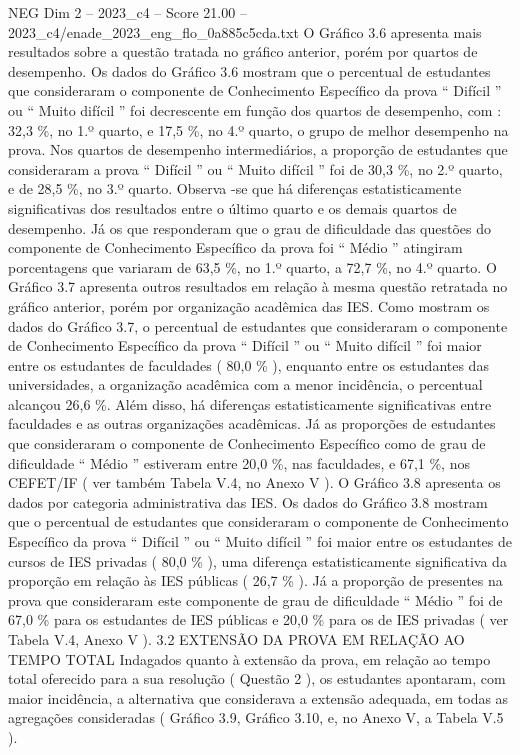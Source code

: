 \begin{textsample}{NEG Dim 2 – 2023\_c4 – Score 21.00 – 2023\_c4/enade\_2023\_eng\_flo\_0a885c5cda.txt}
O Gráfico 3.6 apresenta mais resultados sobre a questão tratada no gráfico anterior, porém por quartos de desempenho.
Os dados do Gráfico 3.6 mostram que o percentual de estudantes que consideraram o componente de Conhecimento Específico da prova “ Difícil ” ou “ Muito difícil ” foi decrescente em função dos quartos de desempenho, com : 32,3 \%, no 1.º quarto, e 17,5 \%, no 4.º quarto, o grupo de melhor desempenho na prova.
Nos quartos de desempenho intermediários, a proporção de estudantes que consideraram a prova “ Difícil ” ou “ Muito difícil ” foi de 30,3 \%, no 2.º quarto, e de 28,5 \%, no 3.º quarto.
Observa -se que há diferenças estatisticamente significativas dos resultados entre o último quarto e os demais quartos de desempenho.
Já os que responderam que o grau de dificuldade das questões do componente de Conhecimento Específico da prova foi “ Médio ” atingiram porcentagens que variaram de 63,5 \%, no 1.º quarto, a 72,7 \%, no 4.º quarto.
O Gráfico 3.7 apresenta outros resultados em relação à mesma questão retratada no gráfico anterior, porém por organização acadêmica das IES.
Como mostram os dados do Gráfico 3.7, o percentual de estudantes que consideraram o componente de Conhecimento Específico da prova “ Difícil ” ou “ Muito difícil ” foi maior entre os estudantes de faculdades ( 80,0 \% ), enquanto entre os estudantes das universidades, a organização acadêmica com a menor incidência, o percentual alcançou 26,6 \%.
Além disso, há diferenças estatisticamente significativas entre faculdades e as outras organizações acadêmicas.
Já as proporções de estudantes que consideraram o componente de Conhecimento Específico como de grau de dificuldade “ Médio ” estiveram entre 20,0 \%, nas faculdades, e 67,1 \%, nos CEFET/IF ( ver também Tabela V.4, no Anexo V ).
O Gráfico 3.8 apresenta os dados por categoria administrativa das IES.
Os dados do Gráfico 3.8 mostram que o percentual de estudantes que consideraram o componente de Conhecimento Específico da prova “ Difícil ” ou “ Muito difícil ” foi maior entre os estudantes de cursos de IES privadas ( 80,0 \% ), uma diferença estatisticamente significativa da proporção em relação às IES públicas ( 26,7 \% ).
Já a proporção de presentes na prova que consideraram este componente de grau de dificuldade “ Médio ” foi de 67,0 \% para os estudantes de IES públicas e 20,0 \% para os de IES privadas ( ver Tabela V.4, Anexo V ). 3.2 EXTENSÃO DA PROVA EM RELAÇÃO AO TEMPO TOTAL Indagados quanto à extensão da prova, em relação ao tempo total oferecido para a sua resolução ( Questão 2 ), os estudantes apontaram, com maior incidência, a alternativa que considerava a extensão adequada, em todas as agregações consideradas ( Gráfico 3.9, Gráfico 3.10, e, no Anexo V, a Tabela V.5 ).

\end{textsample}
